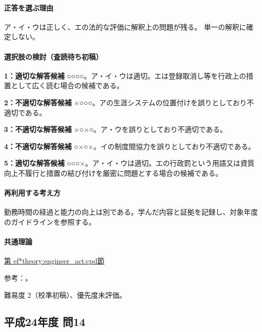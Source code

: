 \paragraph{正答を選ぶ理由} ア・イ・ウは正しく、エの法的な評価に解釈上の問題が残る。 単一の解釈に確定しない。

\paragraph{選択肢の検討（査読待ち初稿）}

\noindent\textbf{1：適切な解答候補} ○○○○。ア・イ・ウは適切。エは登録取消し等を行政上の措置として広く読む場合の候補である。\par

\noindent\textbf{2：不適切な解答候補} ×○○○。アの生涯システムの位置付けを誤りとしており不適切である。\par

\noindent\textbf{3：不適切な解答候補} ×○×○。ア・ウを誤りとしており不適切である。\par

\noindent\textbf{4：不適切な解答候補} ○×○×。イの制度間協力を誤りとしており不適切である。\par

\noindent\textbf{5：適切な解答候補} ○○○×。ア・イ・ウは適切。エの行政罰という用語又は資質向上不履行と措置の結び付けを厳密に問題とする場合の候補である。\par

\paragraph{再利用する考え方} 勤務時間の経過と能力の向上は別である。学んだ内容と証拠を記録し、対象年度のガイドラインを参照する。

\paragraph{共通理論} \hyperref[theory:engineer_act:cpd]{第
ef*{theory:engineer_act:cpd}節}

\par 参考：\cite{engineer_act_current,cpd_v1}。

\par 難易度 2（校準初稿）、優先度未評価。

\subsection{平成24年度 問14}
\label{q:h24-reg-apt-14}

